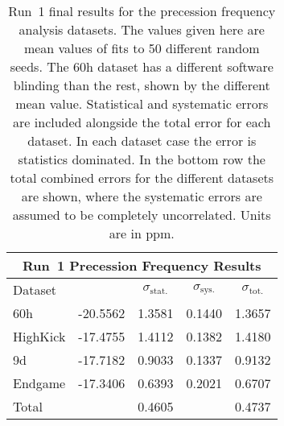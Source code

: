 \begin{table}
\centering
\renewcommand{\arraystretch}{1.2}
\begin{tabular*}{\linewidth}{@{\extracolsep{\fill}}lcccc}
  \hline
    \multicolumn{5}{c}{\textbf{Run~1 Precession Frequency Results}} \\
  \hline\hline
    Dataset & \multicolumn{1}{c}{\R} & \multicolumn{1}{c}{$\sigma_{\text{stat.}}$} & \multicolumn{1}{c}{$\sigma_{\text{sys.}}$} & \multicolumn{1}{c}{$\sigma_{\text{tot.}}$} \\ 
  \hline
    60h & -20.5562 & 1.3581 & 0.1440 & 1.3657 \\
    HighKick & -17.4755 & 1.4112 & 0.1382 & 1.4180 \\
    9d & -17.7182 & 0.9033 & 0.1337 & 0.9132 \\
    Endgame & -17.3406 & 0.6393 & 0.2021 & 0.6707 \\
  \hline
  Total & & 0.4605 & & 0.4737 \\
  \hline
\end{tabular*}
\caption[Run~1 final results]{Run~1 final results for the precession frequency analysis datasets. The \R values given here are mean values of fits to 50 different random seeds. The 60h dataset has a different software blinding than the rest, shown by the different mean \R value. Statistical and systematic errors are included alongside the total error for each dataset. In each dataset case the error is statistics dominated. In the bottom row the total combined errors for the different datasets are shown, where the systematic errors are assumed to be completely uncorrelated. Units are in ppm.}
\label{tab:FinalResults}
\end{table}







